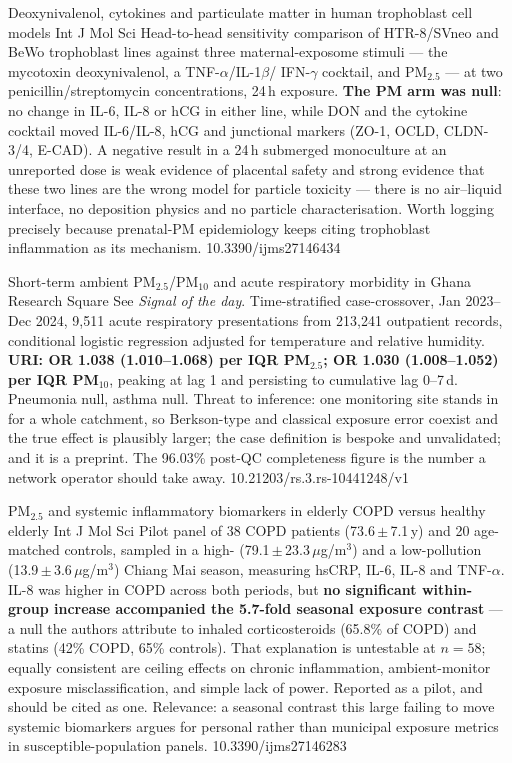 \documentclass[10pt]{article}
\begin{document}

{Deoxynivalenol, cytokines and particulate matter in human trophoblast cell models}
{Int J Mol Sci}
{Head-to-head sensitivity comparison of HTR-8/SVneo and BeWo trophoblast lines against
three maternal-exposome stimuli --- the mycotoxin deoxynivalenol, a TNF-$\alpha$/IL-1$\beta$/
IFN-$\gamma$ cocktail, and PM$_{2.5}$ --- at two penicillin/streptomycin concentrations,
24\,h exposure. \textbf{The PM arm was null}: no change in IL-6, IL-8 or hCG in either
line, while DON and the cytokine cocktail moved IL-6/IL-8, hCG and junctional markers
(ZO-1, OCLD, CLDN-3/4, E-CAD). A negative result in a 24\,h submerged monoculture at an
unreported dose is weak evidence of placental safety and strong evidence that these two
lines are the wrong model for particle toxicity --- there is no air--liquid interface, no
deposition physics and no particle characterisation. Worth logging precisely because
prenatal-PM epidemiology keeps citing trophoblast inflammation as its mechanism.}
{10.3390/ijms27146434}


{Short-term ambient PM$_{2.5}$/PM$_{10}$ and acute respiratory morbidity in Ghana}
{Research Square}
{See \textit{Signal of the day}. Time-stratified case-crossover, Jan 2023--Dec 2024,
9{,}511 acute respiratory presentations from 213{,}241 outpatient records, conditional
logistic regression adjusted for temperature and relative humidity.
\textbf{URI: OR 1.038 (1.010--1.068) per IQR PM$_{2.5}$; OR 1.030 (1.008--1.052) per IQR
PM$_{10}$}, peaking at lag 1 and persisting to cumulative lag 0--7\,d. Pneumonia null,
asthma null. Threat to inference: one monitoring site stands in for a whole catchment, so
Berkson-type and classical exposure error coexist and the true effect is plausibly larger;
the case definition is bespoke and unvalidated; and it is a preprint. The 96.03\%
post-QC completeness figure is the number a network operator should take away.}
{10.21203/rs.3.rs-10441248/v1}

{PM$_{2.5}$ and systemic inflammatory biomarkers in elderly COPD versus healthy elderly}
{Int J Mol Sci}
{Pilot panel of 38 COPD patients (73.6\,$\pm$\,7.1\,y) and 20 age-matched controls,
sampled in a high- (79.1\,$\pm$\,23.3\,$\mu$g/m$^3$) and a low-pollution
(13.9\,$\pm$\,3.6\,$\mu$g/m$^3$) Chiang Mai season, measuring hsCRP, IL-6, IL-8 and
TNF-$\alpha$. IL-8 was higher in COPD across both periods, but \textbf{no significant
within-group increase accompanied the 5.7-fold seasonal exposure contrast} --- a null the
authors attribute to inhaled corticosteroids (65.8\% of COPD) and statins (42\% COPD,
65\% controls). That explanation is untestable at $n=58$; equally consistent are ceiling
effects on chronic inflammation, ambient-monitor exposure misclassification, and simple
lack of power. Reported as a pilot, and should be cited as one. Relevance: a seasonal
contrast this large failing to move systemic biomarkers argues for personal rather than
municipal exposure metrics in susceptible-population panels.}
{10.3390/ijms27146283}
\end{document}
